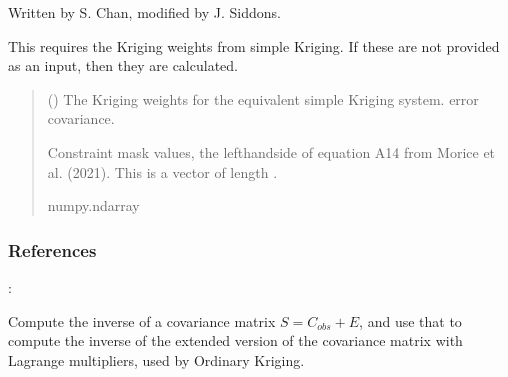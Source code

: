 \documentclass[letterpaper,10pt,english]{sphinxmanual}
\begin{document}
\begin{fulllineitems}
\begin{fulllineitems}
\sphinxAtStartPar
Written by S. Chan, modified by J. Siddons.

\sphinxAtStartPar
This requires the Kriging weights from simple Kriging. If these are
not provided as an input, then they are calculated.
\begin{quote}\begin{description}
\sphinxAtStartPar
{} (\sphinxstyleliteralemphasis{\sphinxupquote{ | }}\sphinxstyleliteralemphasis{\sphinxupquote{,}}) \textendash{} The Kriging weights for the equivalent simple Kriging system.
error covariance.

\sphinxAtStartPar
{} \textendash{} Constraint mask values, the left\sphinxhyphen{}hand\sphinxhyphen{}side of equation A14 from
Morice et al. (2021). This is a vector of length .

\sphinxAtStartPar
numpy.ndarray

\end{description}\end{quote}
\subsubsection*{References}

\sphinxAtStartPar
{}: 

\end{fulllineitems}


\begin{fulllineitems}
\label{\detokenize{kriging:glomar_gridding.kriging.OrdinaryKriging.extended_inverse}}
\pysigstartsignatures
\pysiglinewithargsret
{}
{}
{}
\pysigstopsignatures
\sphinxAtStartPar
Compute the inverse of a covariance matrix \(S = C_{obs} + E\), and
use that to compute the inverse of the extended version of the
covariance matrix with Lagrange multipliers, used by Ordinary Kriging.


\end{fulllineitems}
\end{fulllineitems}
\end{document}
